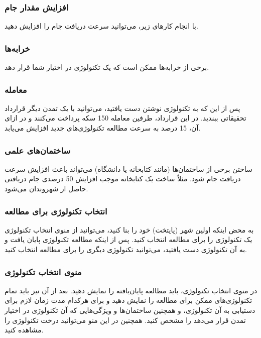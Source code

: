 \documentclass[]{article}
\begin{document}
\subsubsection*{{\titr افزایش مقدار جام}}
 با انجام کارهای زیر، می‌توانید سرعت دریافت جام را افزایش دهید.

\subsubsection*{{\titr خرابه‌ها}}
برخی از خرابه‌ها ممکن است که یک تکنولوژی در اختیار شما قرار دهد.

\subsubsection*{{\titr معامله}}
پس از این که به تکنولوژی نوشتن دست یافتید، می‌توانید با یک تمدن دیگر قرارداد تحقیقاتی ببندید. در این قرارداد، طرفین معامله 150 سکه پرداخت می‌کنند و در ازای آن، 15 درصد به سرعت مطالعه تکنولوژی‌های جدید افزایش می‌یابد.

\subsubsection*{{\titr ساختمان‌های علمی}}
ساختن برخی از ساختمان‌ها (مانند کتابخانه یا دانشگاه) می‌تواند باعث افزایش سرعت دریافت جام شود. مثلاً ساخت یک کتابخانه موجب افزایش 50 درصدی جام دریافتی حاصل از شهروندان می‌شود.

\subsubsection*{{\titr انتخاب تکنولوژی برای مطالعه}}
به محض اینکه اولین شهر (پایتخت) خود را بنا کنید، می‌توانید از منوی انتخاب تکنولوژی یک تکنولوژی را برای مطالعه انتخاب کنید. پس از اینکه مطالعه تکنولوژی پایان یافت و به آن تکنولوژی دست یافتید، می‌توانید تکنولوژی دیگری را برای مطالعه انتخاب کنید.

\subsubsection*{{\titr منوی انتخاب تکنولوژی}}
در منوی انتخاب تکنولوژی، باید مطالعه پایان‌یافته را نمایش دهید. بعد از آن نیز باید تمام تکنولوژی‌های ممکن برای مطالعه را نمایش دهید و برای هرکدام مدت زمان لازم برای دستیابی به آن تکنولوژی، و همچنین ساختمان‌ها و ویژگی‌هایی که آن تکنولوژی در اختیار تمدن قرار می‌دهد را مشخص کنید. همچنین در این منو می‌توانید درخت تکنولوژی را مشاهده کنید.
\end{document}
